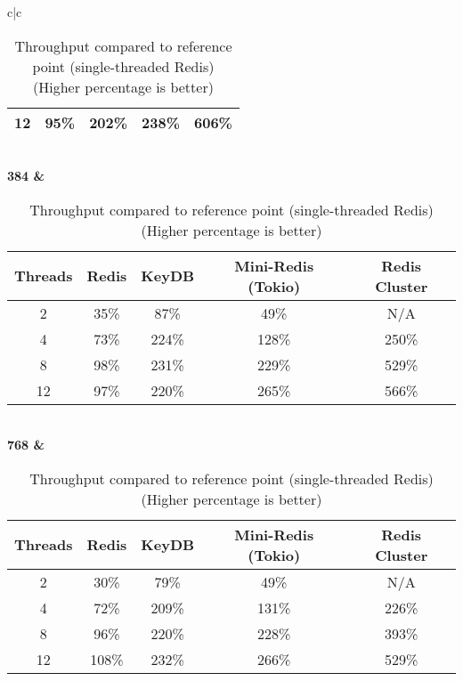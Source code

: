 \begin{center}
\begin{table}
\begin{tabular}{c|c}
\begin{tabular}{c|cccc}
                 12 &   95\% &  202\% &               238\% &          606\% \\
            \bottomrule
        \end{tabular} \\
        \bf{384} & \begin{tabular}{c|cccc}
            \toprule
            Threads & Redis & KeyDB & Mini-Redis (Tokio) & Redis Cluster \\
            \midrule
                  2 &   35\% &   87\% &                49\% &           N/A \\
                  4 &   73\% &  224\% &               128\% &          250\% \\
                  8 &   98\% &  231\% &               229\% &          529\% \\
                 12 &   97\% &  220\% &               265\% &          566\% \\
            \bottomrule
        \end{tabular} \\
        \bf{768} & \begin{tabular}{c|cccc}
            \toprule
            Threads & Redis & KeyDB & Mini-Redis (Tokio) & Redis Cluster \\
            \midrule
                  2 &   30\% &   79\% &                49\% &           N/A \\
                  4 &   72\% &  209\% &               131\% &          226\% \\
                  8 &   96\% &  220\% &               228\% &          393\% \\
                 12 &  108\% &  232\% &               266\% &          529\% \\
            \bottomrule
        \end{tabular} \\
        \bottomrule
    \end{tabular}
    \caption{Throughput compared to reference point (single-threaded Redis) (Higher percentage is better)}
    \label{tbl:table_of_figures_throughput_tables}
\end{table}
\end{center}
